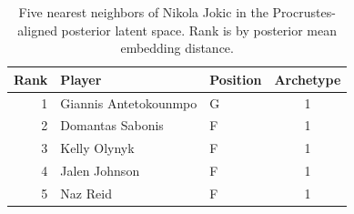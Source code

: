\begin{table}[htbp]
  \centering\small
  \begin{tabular}{rllc}
    \toprule
    Rank & Player & Position & Archetype \\
    \midrule
    1 & Giannis Antetokounmpo & G & 1 \\
    2 & Domantas Sabonis & F & 1 \\
    3 & Kelly Olynyk & F & 1 \\
    4 & Jalen Johnson & F & 1 \\
    5 & Naz Reid & F & 1 \\
    \bottomrule
  \end{tabular}
  \caption{Five nearest neighbors of Nikola Jokic in the Procrustes-aligned posterior latent space. Rank is by posterior mean embedding distance.}
  \label{tab:Nikola_Jokic_neighbors}
\end{table}

